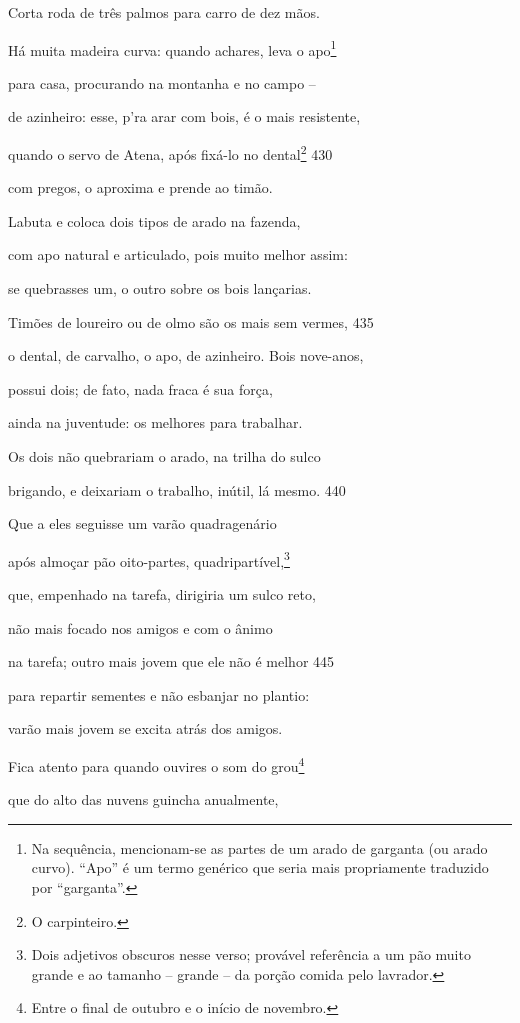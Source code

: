 Corta roda de três palmos para carro de dez mãos.

Há muita madeira curva: quando achares, leva o apo\footnote{Na sequência, mencionam-se as partes de um arado de garganta (ou
arado curvo). ``Apo'' é um termo genérico que seria mais propriamente
traduzido por ``garganta''.}

para casa, procurando na montanha e no campo --

de azinheiro: esse, p'ra arar com bois, é o mais resistente,

quando o servo de Atena, após fixá-lo no dental\footnote{O carpinteiro.} \num{430}

com pregos, o aproxima e prende ao timão.

Labuta e coloca dois tipos de arado na fazenda,

com apo natural e articulado, pois muito melhor assim:

se quebrasses um, o outro sobre os bois lançarias.

Timões de loureiro ou de olmo são os mais sem vermes, \num{435}

o dental, de carvalho, o apo, de azinheiro. Bois nove-anos,

possui dois; de fato, nada fraca é sua força,

ainda na juventude: os melhores para trabalhar.

Os dois não quebrariam o arado, na trilha do sulco

brigando, e deixariam o trabalho, inútil, lá mesmo. \num{440}

Que a eles seguisse um varão quadragenário

após almoçar pão oito-partes, quadripartível,\footnote{Dois adjetivos obscuros nesse verso; provável referência a um pão muito grande e ao tamanho -- grande -- da porção comida pelo lavrador.}

que, empenhado na tarefa, dirigiria um sulco reto,

não mais focado nos amigos e com o ânimo

na tarefa; outro mais jovem que ele não é melhor \num{445}

para repartir sementes e não esbanjar no plantio:

varão mais jovem se excita atrás dos amigos.

Fica atento para quando ouvires o som do grou\footnote{Entre o final de outubro e o início de novembro.}

que do alto das nuvens guincha anualmente,

